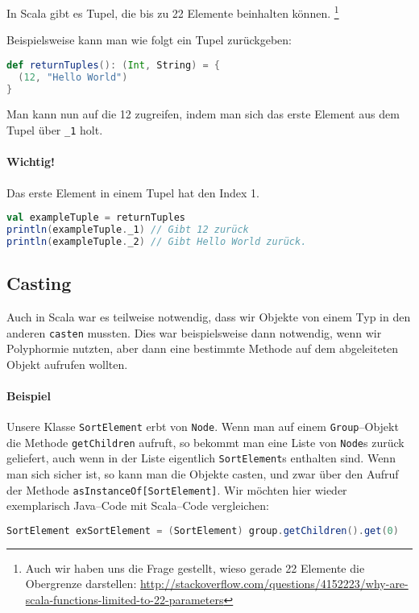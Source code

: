 In Scala gibt es Tupel, die bis zu 22 Elemente beinhalten können. \footnote{Auch wir haben uns die Frage gestellt, wieso gerade 22 Elemente die Obergrenze darstellen: \url{http://stackoverflow.com/questions/4152223/why-are-scala-functions-limited-to-22-parameters}}

Beispielsweise kann man wie folgt ein Tupel zurückgeben:

\begin{lstlisting}[language=Scala, numbers=none]
def returnTuples(): (Int, String) = {
  (12, "Hello World")
}
\end{lstlisting}

Man kann nun auf die 12 zugreifen, indem man sich das erste Element aus dem Tupel über \texttt{\_1} holt.
\paragraph{Wichtig!}Das erste Element in einem Tupel hat den Index 1.

\begin{lstlisting}[language=Scala, numbers=none, caption=Zugriff auf die Elemente eines Tupels]
val exampleTuple = returnTuples
println(exampleTuple._1) // Gibt 12 zurück
println(exampleTuple._2) // Gibt Hello World zurück.
\end{lstlisting}

\subsection{Casting}
Auch in Scala war es teilweise notwendig, dass wir Objekte von einem Typ in den anderen \texttt{casten} mussten. Dies war beispielsweise dann notwendig, wenn wir Polyphormie nutzten, aber dann eine bestimmte Methode auf dem abgeleiteten Objekt aufrufen wollten.

\paragraph{Beispiel} Unsere Klasse \texttt{SortElement} erbt von \texttt{Node}. Wenn man auf einem \texttt{Group}--Objekt die Methode \texttt{getChildren} aufruft, so bekommt man eine Liste von \texttt{Node}s zurück geliefert, auch wenn in der Liste eigentlich \texttt{SortElement}s enthalten sind. Wenn man sich sicher ist, so kann man die Objekte casten, und zwar über den Aufruf der Methode \texttt{asInstanceOf[SortElement]}. Wir möchten hier wieder exemplarisch Java--Code mit Scala--Code vergleichen:

\begin{lstlisting}[language=Java,numbers=none,caption=Casting in Java: Von Node zu SortElement]
SortElement exSortElement = (SortElement) group.getChildren().get(0)
\end{lstlisting}

